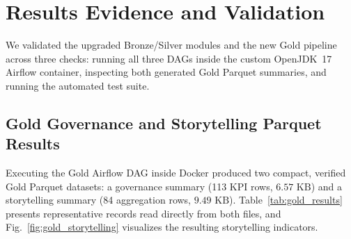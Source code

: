 \section{Results Evidence and Validation}

We validated the upgraded Bronze/Silver modules and the new Gold pipeline across three checks: running all three DAGs inside the custom OpenJDK~17 Airflow container, inspecting both generated Gold Parquet summaries, and running the automated test suite.

\subsection{Gold Governance and Storytelling Parquet Results}
Executing the Gold Airflow DAG inside Docker produced two compact, verified Gold Parquet datasets: a governance summary (113 KPI rows, $6.57\text{ KB}$) and a storytelling summary (84 aggregation rows, $9.49\text{ KB}$). Table~\ref{tab:gold_results} presents representative records read directly from both files, and Fig.~\ref{fig:gold_storytelling} visualizes the resulting storytelling indicators.

